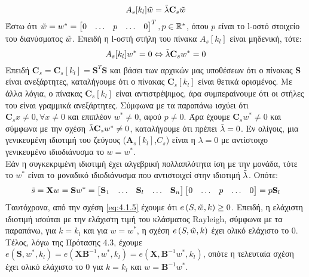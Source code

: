 $$
A_s[k_l] \Tilde{w} = \Tilde{\lambda} \mathbf{C}_s \Tilde{w}
$$
Έστω ότι $\Tilde{w} = w^* = \begin{bmatrix}
 0 & \ldots & p & \ldots & 0
\end{bmatrix}^T , p \in \mathbb{R}^*$, όπου $p$ είναι το l-οστό στοιχείο του διανύσματος $\Tilde{w}$. Επειδή η l-οστή στήλη του πίνακα $A_s[k_l]$ είναι μηδενική, τότε:
$$
A_s[k_l] w^* = 0 \Leftrightarrow \Tilde{\lambda} \mathbf{C}_s w^* = 0
$$
Επειδή $\mathbf{C}_s = \mathbf{C}_s[k_l] = \mathbf{S}^T \mathbf{S}$ και βάσει των αρχικών μας υποθέσεων ότι ο πίνακας $\mathbf{S}$ είναι ανεξάρτητες, καταλήγουμε ότι ο πίνακας $\mathbf{C}_s[k_l]$ είναι θετικά ορισμένος. Με άλλα λόγια, ο πίνακας $\mathbf{C}_s[k_l]$ είναι αντιστρέψιμος, άρα συμπεραίνουμε ότι οι στήλες του είναι γραμμικά ανεξάρτητες. Σύμφωνα με τα παραπάνω ισχύει ότι $\mathbf{C}_s x \neq 0, \forall x \neq 0$ και επιπλέον $w^* \neq 0$, αφού $p \neq 0$. Άρα έχουμε $\mathbf{C}_s w^* \neq 0$ και σύμφωνα με την σχέση $\Tilde{\lambda} \mathbf{C}_s w^* \neq 0$, καταλήγουμε ότι πρέπει $\Tilde{\lambda} = 0$. Εν ολίγοις, μια γενικευμένη ιδιοτιμή του ζεύγους ($\mathbf{A}_s[k_l]$,$C_s$) είναι η $\lambda = 0$ με αντίστοιχο γενικευμένο ιδιοδιάνυσμα το $w = w^*$.
\\ 
Εάν η συγκεκριμένη ιδιοτιμή έχει αλγεβρική πολλαπλότητα ίση με την μονάδα, τότε το $w^*$ είναι το μοναδικό ιδιοδιάνυσμα που αντιστοιχεί στην ιδιοτιμή $\Tilde{\lambda}$. Οπότε:
$$
\Tilde{s} = \mathbf{X} w = \mathbf{S} w^* = 
\begin{bmatrix}
\mathbf{S}_1 & \ldots & \mathbf{S}_l & \ldots & \mathbf{S}_n 
\end{bmatrix} 
\begin{bmatrix}
0 & \ldots & p & \ldots & 0
\end{bmatrix} = p \mathbf{S}_l
$$
Ταυτόχρονα, από την σχέση \eqref{eq:4.1.5} έχουμε ότι $e\left ( S,\Tilde{w},k \right ) \geq 0$. Επειδή, η ελάχιστη ιδιοτιμή ισούται με την ελάχιστη τιμή του κλάσματος Rayleigh, σύμφωνα με τα παραπάνω, για $k = k_l$ και για $w = w^*$, η σχέση $e\left ( S,\Tilde{w},k \right )$ έχει ολικό ελάχιστο το 0. Τέλος, λόγω της Πρότασης 4.3, έχουμε $e \left ( \mathbf{S},w^*,k_l \right ) = e \left ( \mathbf{X} \mathbf{B}^{-1}, w^*,k_l \right ) = e \left ( \mathbf{X},\mathbf{B}^{-1}w^*,k_l \right )$, οπότε η τελευταία σχέση έχει ολικό ελάχιστο το 0 για $k=k_l$ και $w = \mathbf{B}^{-1} w^*$.
\\ \\
